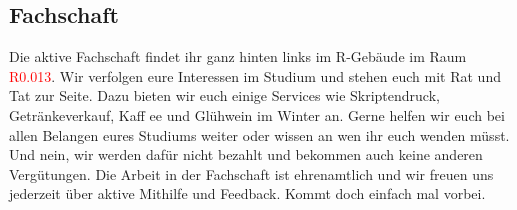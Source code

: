 \subsection{Fachschaft}
Die aktive Fachschaft findet ihr ganz hinten links im R-Gebäude im 
Raum \textcolor{red}{R0.013}. Wir verfolgen eure Interessen im Studium und stehen 
euch mit Rat und Tat zur Seite. Dazu bieten wir euch einige Services wie 
Skriptendruck, Getränkeverkauf, Kaff ee und Glühwein im Winter an. 
Gerne helfen wir euch bei allen Belangen eures 
Studiums weiter oder wissen an wen ihr euch wenden 
müsst. Und nein, wir werden dafür nicht bezahlt 
und bekommen auch keine anderen Vergütungen. 
Die Arbeit in der Fachschaft ist ehrenamtlich und wir 
freuen uns jederzeit über aktive Mithilfe und Feedback. 
Kommt doch einfach mal vorbei. 





